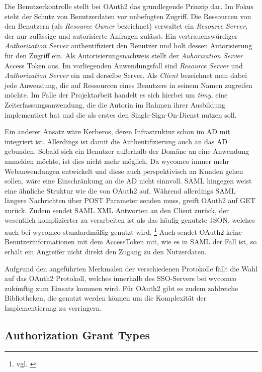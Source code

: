 Die Benutzerkontrolle stellt bei OAuth2 das grundlegende Prinzip dar. Im Fokus steht der Schutz von Benutzerdaten vor unbefugten Zugriff. Die Ressourcen von den Benutzern (als \textit{Resource Owner} bezeichnet) verwaltet ein \textit{Resource Server}, der nur zulässige und autorisierte Anfragen zulässt. Ein vertrauenswürdiger \textit{Authorization Server} authentifiziert den Benutzer und holt dessen Autorisierung für den Zugriff ein. Als Autorisierungsnachweis stellt der \textit{Auhorization Server} Access Token aus. Im vorliegenden Anwendungsfall sind \textit{Resource Server} und \textit{Authorization Server} ein und derselbe Server.
Als \textit{Client} bezeichnet man dabei jede Anwendung, die auf Ressourcen eines Benutzers in seinem Namen zugreifen möchte. Im Falle der Projektarbeit handelt es sich hierbei um \textit{timy}, eine Zeiterfassungsanwendung, die die Autorin im Rahmen ihrer Ausbildung implementiert hat und die als erstes den Single-Sign-On-Dienst nutzen soll. 

Ein anderer Ansatz wäre Kerberos, deren Infrastruktur schon im \acs{AD} mit integriert ist. Allerdings ist damit die Authentifizierung auch an das \acs{AD} gebunden. Sobald sich ein Benutzer außerhalb der Domäne an eine Anwendung anmelden möchte, ist dies nicht mehr möglich. Da wycomco immer mehr Webanwendungen entwickelt und diese auch perspektivisch an Kunden gehen sollen, wäre eine Einschränkung an die AD nicht sinnvoll. 
\acs{SAML} hingegen weist eine ähnliche Struktur wie die von OAuth2 auf. Während allerdings SAML längere Nachrichten über POST Parameter senden muss, greift OAuth2 auf GET zurück. Zudem sendet SAML \acs{XML} Antworten an den Client zurück, der wesentlich komplizierter zu verarbeiten ist als das häufig genutzte \acs{JSON}, welches auch bei wycomco standardmäßig genutzt wird. \footnote{vgl. \cite{SSO-Vgl}}
Auch sendet OAuth2 keine Benutzerinformationen mit dem AccessToken mit, wie es in SAML der Fall ist, so erhält ein Angreifer nicht direkt den Zugang zu den Nutzerdaten.

Aufgrund den angeführten Merkmalen der verschiedenen Protokolle fällt die Wahl auf das OAuth2 Protokoll, welches innerhalb des SSO-Servers bei wycomco zukünftig zum Einsatz kommen wird. Für OAuth2 gibt es zudem zahlreiche Bibliotheken, die genutzt werden können um die Komplexität der Implementierung zu verringern.

\subsection{Authorization Grant Types}
\label{sec:AuthorizationGrants}

